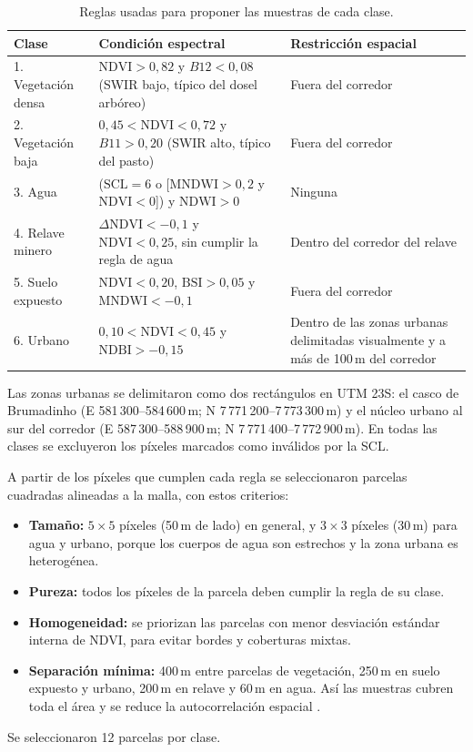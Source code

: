 \documentclass{article}
\begin{document}
\begin{table}[htbp]
 \centering
 \small
 \caption{Reglas usadas para proponer las muestras de cada clase.}
 \label{tab:reglas}
 \begin{tabularx}{\textwidth}{lXX}
  \toprule
  Clase & Condición espectral & Restricción espacial \\
  \midrule
  1. Vegetación densa & $\mathrm{NDVI} > 0{,}82$ y $B12 < 0{,}08$ (SWIR bajo, típico del dosel arbóreo) & Fuera del corredor \\
  2. Vegetación baja & $0{,}45 < \mathrm{NDVI} < 0{,}72$ y $B11 > 0{,}20$ (SWIR alto, típico del pasto) & Fuera del corredor \\
  3. Agua & ($\mathrm{SCL} = 6$ o [$\mathrm{MNDWI} > 0{,}2$ y $\mathrm{NDVI} < 0$]) y $\mathrm{NDWI} > 0$ & Ninguna \\
  4. Relave minero & $\Delta\mathrm{NDVI} < -0{,}1$ y $\mathrm{NDVI} < 0{,}25$, sin cumplir la regla de agua & Dentro del corredor del relave \\
  5. Suelo expuesto & $\mathrm{NDVI} < 0{,}20$, $\mathrm{BSI} > 0{,}05$ y $\mathrm{MNDWI} < -0{,}1$ & Fuera del corredor \\
  6. Urbano & $0{,}10 < \mathrm{NDVI} < 0{,}45$ y $\mathrm{NDBI} > -0{,}15$ & Dentro de las zonas urbanas delimitadas visualmente y a más de 100\,m del corredor \\
  \bottomrule
 \end{tabularx}
\end{table}

Las zonas urbanas se delimitaron como dos rectángulos en UTM 23S: el casco de Brumadinho (E 581\,300--584\,600\,m; N 7\,771\,200--7\,773\,300\,m) y el núcleo urbano al sur del corredor (E 587\,300--588\,900\,m; N 7\,771\,400--7\,772\,900\,m). En todas las clases se excluyeron los píxeles marcados como inválidos por la SCL.

A partir de los píxeles que cumplen cada regla se seleccionaron parcelas cuadradas alineadas a la malla, con estos criterios:
\begin{itemize}
 \item \textbf{Tamaño:} $5 \times 5$ píxeles (50\,m de lado) en general, y $3 \times 3$ píxeles (30\,m) para agua y urbano, porque los cuerpos de agua son estrechos y la zona urbana es heterogénea.
 \item \textbf{Pureza:} todos los píxeles de la parcela deben cumplir la regla de su clase.
 \item \textbf{Homogeneidad:} se priorizan las parcelas con menor desviación estándar interna de NDVI, para evitar bordes y coberturas mixtas.
 \item \textbf{Separación mínima:} 400\,m entre parcelas de vegetación, 250\,m en suelo expuesto y urbano, 200\,m en relave y 60\,m en agua. Así las muestras cubren toda el área y se reduce la autocorrelación espacial \parencite{Congalton1991}.
\end{itemize}
Se seleccionaron 12 parcelas por clase.
\end{document}
